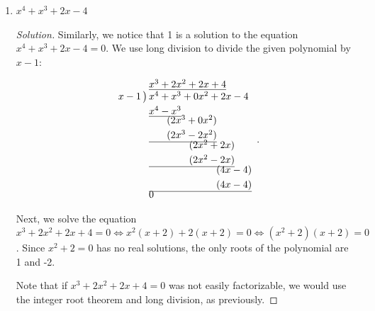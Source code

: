\documentclass[12pt]{article}
\newenvironment{solution}{\begin{proof}[Solution]}{\end{proof}}
\begin{document}
\begin{enumerate}
\begin{enumerate}
\begin{solution}
			Thus, the roots of the polynomial are $-1,2,3$.
			\end{solution}
			\item $x^4+x^3+2x-4$
			\begin{solution}
				Similarly, we notice that 1 is a solution to the equation $x^4+x^3+2x-4=0$. We use long division to divide the given polynomial by $x-1$:
				
				$$
				\begin{array}{r@{}l}
					& \underline{x^3+2x^2+2x+4} \\
					x-1\,\big)\,& x^4+x^3+0x^2+2x-4 \\[1mm]
					& \underline{x^4-x^3} \\[-1mm]
					& \phantom{x^4+}(2x^3+0x^2) \\[1mm]
					& \underline{\phantom{x^4+}(2x^3-2x^2)} \\[-1mm]
					& \phantom{x^4+x^3+}(2x^2+2x) \\[1mm]
					& \underline{\phantom{x^4+x^3+}(2x^2-2x)} \\[-1mm]
					& \phantom{x^4+x^3+0x^2+}(4x-4) \\[1mm]
					& \underline{\phantom{x^4+x^3+0x^2+}(4x-4)} \\[-1mm]
					& 0
				\end{array}.
				$$
				
				Next, we solve the equation $x^3+2x^2+2x+4=0 \iff x^2(x+2)+2(x+2)=0\iff (x^2+2)(x+2)=0$. Since $x^2+2=0$ has no real solutions, the only roots of the polynomial are 1 and -2.
				
				Note that if $x^3+2x^2+2x+4=0$ was not easily factorizable, we would use the integer root theorem and long division, as previously. 
			\end{solution}
		\end{enumerate}
		

\end{enumerate}
\end{document}
